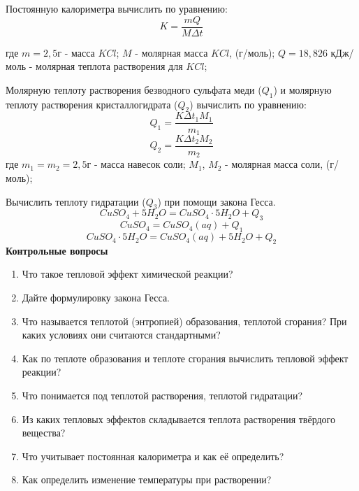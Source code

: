 Постоянную калориметра вычислить по уравнению:
$$K=\frac{mQ}{M\Delta t}$$

где $m=2,5$г - масса $KCl$; $M$ - молярная масса $KCl$, (г/моль); $Q=18,826$ кДж/моль - молярная  теплота растворения для  $KCl$;

Молярную теплоту растворения безводного сульфата меди ($Q_{1}$) и молярную теплоту растворения кристаллогидрата ($Q_{2}$) вычислить по уравнению:
$$Q_{1}=\frac{K\Delta t_{1}M_{1}}{m_{1}}$$
$$Q_{2}=\frac{K\Delta t_{2}M_{2}}{m_{2}}$$
где $m_{1}=m_{2}=2,5$г - масса навесок соли; $M_{1}$, $M_{2}$ - молярная масса соли, (г/моль);

Вычислить теплоту гидратации ($Q_{3}$) при помощи закона Гесса.
$$CuSO_{4}+5H_{2}O=CuSO_{4}\cdot 5H_{2}O+Q_{3} $$
$$CuSO_{4}=CuSO_{4}(aq)+Q_{1} $$
$$CuSO_{4}\cdot 5H_{2}O= CuSO_{4}(aq)+5H_{2}O+Q_{2}$$
\textbf{Контрольные вопросы}
\begin{enumerate}
\item Что такое тепловой эффект химической реакции?
\item Дайте формулировку закона Гесса.
\item Что  называется  теплотой  (энтропией) образования,  теплотой сгорания? При каких условиях они считаются стандартными?
\item Как по теплоте образования и теплоте сгорания вычислить тепловой эффект реакции?
\item Что понимается под теплотой растворения, теплотой гидратации?
\item Из каких тепловых эффектов складывается  теплота  растворения твёрдого вещества?
\item Что учитывает постоянная калориметра и как её определить?
\item Как определить изменение температуры при растворении?
\end{enumerate}
